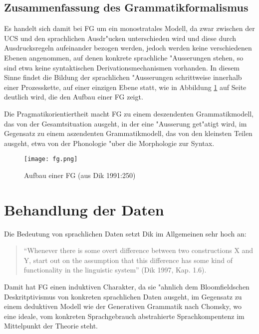 \documentclass[a4paper]{article}
\begin{document}
\subsection{Zusammenfassung des Grammatikformalismus} \label{monostratal} \label{deszendent}

Es handelt sich damit bei FG um ein monostratales Modell,
da zwar zwischen der UCS und den sprachlichen Ausdr"ucken unterschieden wird
und diese durch Ausdrucksregeln aufeinander bezogen werden, jedoch werden keine
verschiedenen Ebenen angenommen, auf denen konkrete sprachliche "Ausserungen
stehen, so sind etwa keine syntaktischen Derivationsmechanismen vorhanden. In
diesem Sinne findet die Bildung der sprachlichen "Ausserungen schrittweise
innerhalb einer Prozesskette, auf einer einzigen Ebene statt, wie in Abbildung
\ref{fg} auf Seite \pageref{fg} deutlich wird, die den Aufbau einer FG zeigt.

Die Pragmatikorientiertheit macht FG zu einem deszendenten Grammatikmodell, das
von der Gesamtsituation ausgeht, in der eine "Ausserung get"atigt wird, im
Gegensatz zu einem aszendenten Grammatikmodell, das von den kleinsten Teilen
ausgeht, etwa von der Phonologie "uber die Morphologie zur Syntax.

\begin{figure}
\begin{center}
\texttt{[image: fg.png]}
\end{center}
\caption{Aufbau einer FG (aus Dik 1991:250)} \label{fg}
\end{figure}

\section{Behandlung der Daten} \label{induktiv}

Die Bedeutung von sprachlichen Daten setzt Dik im Allgemeinen sehr hoch an:

\begin{quote}
``Whenever there is some overt difference between two constructions X and Y,
start out on the assumption that this difference has some kind of functionality
in the linguistic system'' (Dik 1997, Kap. 1.6).
\end{quote}

Damit hat FG einen induktiven Charakter, da sie "ahnlich dem
Bloomfieldschen Deskritptivismus von konkreten sprachlichen Daten ausgeht, im
Gegensatz zu einem deduktiven Modell wie der Generativen Grammatik nach
Chomsky, wo eine ideale, vom konkreten Sprachgebrauch abstrahierte
Sprachkompentenz im Mittelpunkt der Theorie steht.
\end{document}
